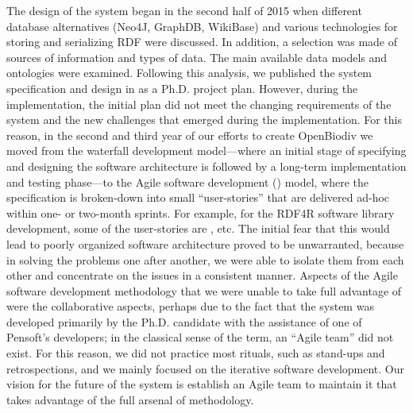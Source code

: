 The design of the system began in the second half of 2015 when different database alternatives (Neo4J, GraphDB, WikiBase) and various technologies for storing and serializing RDF were discussed. In addition, a selection was made of sources of information and types of data. The main available data models and ontologies were examined. Following this analysis, we published the system specification and design in \cite {senderov_open_2016} as a Ph.D. project plan. However, during the implementation, the initial plan did not meet the changing requirements of the system and the new challenges that emerged during the implementation. For this reason, in the second and third year of our efforts to create OpenBiodiv we moved from the waterfall development model---where an initial stage of specifying and designing the software architecture is followed by a long-term implementation and testing phase---to the Agile software development (\cite{beck_manifesto_2001}) model, where the specification is broken-down into small ``user-stories'' that are delivered ad-hoc within one- or two-month sprints. For example, for the RDF4R software library development, some of the user-stories are , etc. The initial fear that this would lead to poorly organized software architecture proved to be unwarranted, because in solving the problems one after another, we were able to isolate them from each other and concentrate on the issues in a consistent manner. Aspects of the Agile software development methodology that we were unable to take full advantage of were the collaborative aspects, perhaps due to the fact that the system was developed primarily by the Ph.D. candidate with the assistance of one of Pensoft's developers; in the classical sense of the term, an ``Agile team'' did not exist. For this reason, we did not practice most rituals, such as stand-ups and retrospections, and we mainly focused on the iterative software development. Our vision for the future of the system is establish an Agile team to maintain it that takes advantage of the full arsenal of methodology.